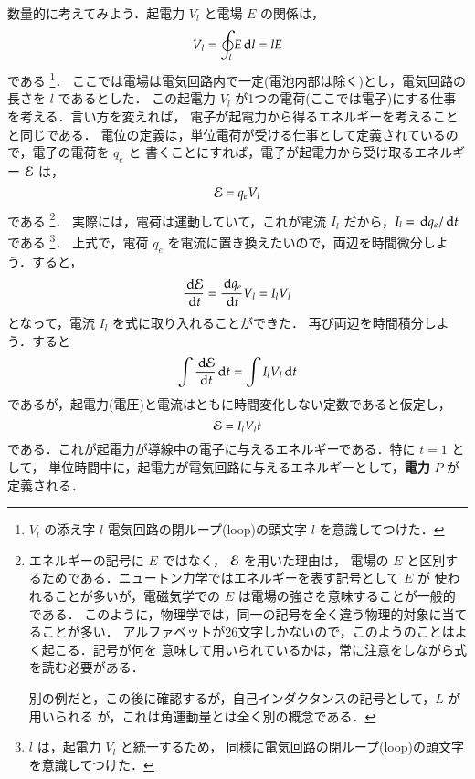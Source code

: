             数量的に考えてみよう．起電力 $V_{l}$ と電場 $E$ の関係は，
                \begin{equation*}
                    V_{l} = \oint_{l} E \,\mathrm{d} l = lE
                \end{equation*}
            である
                \footnote{
                    $V_{l}$ の添え字 $l$ 電気回路の閉ループ(loop)の頭文字 $l$ を意識してつけた．
                }．
            ここでは電場は電気回路内で一定(電池内部は除く)とし，電気回路の長さを $l$ であるとした．
            この起電力 $V_{l}$ が1つの電荷(ここでは電子)にする仕事を考える．言い方を変えれば，
            電子が起電力から得るエネルギーを考えることと同じである．
            電位の定義は，単位電荷が受ける仕事として定義されているので，電子の電荷を $q_{e}$ と
            書くことにすれば，電子が起電力から受け取るエネルギー $\mathcal{E}$ は，
                \begin{equation*}
                    \mathcal{E} = q_{e}V_{l}
                \end{equation*}
            である
                \footnote{
                    エネルギーの記号に $E$ ではなく， $\mathcal{E}$ を用いた理由は，
                    電場の $E$ と区別するためである．ニュートン力学ではエネルギーを表す記号として $E$ が
                    使われることが多いが，電磁気学での $E$ は電場の強さを意味することが一般的である．
                    このように，物理学では，同一の記号を全く違う物理的対象に当てることが多い．
                    アルファベットが26文字しかないので，このようのことはよく起こる．記号が何を
                    意味して用いられているかは，常に注意をしながら式を読む必要がある．

                    別の例だと，この後に確認するが，自己インダクタンスの記号として，$L$ が用いられる
                    が，これは角運動量とは全く別の概念である．
                }．
            実際には，電荷は運動していて，これが電流 $I_{l}$ だから，$I_{l}=\,\mathrm{d} q_{e}/\,\mathrm{d} t$ である
                \footnote{
                    $l$ は，起電力 $V_{l}$ と統一するため，
                    同様に電気回路の閉ループ(loop)の頭文字を意識してつけた．
                }．
            上式で，電荷 $q_{e}$ を電流に置き換えたいので，両辺を時間微分しよう．すると，
                \begin{equation*}
                    \frac{\,\mathrm{d} \mathcal{E}}{\,\mathrm{d} t} = \frac{\,\mathrm{d} q_{e}}{\,\mathrm{d} t}V_{l}=I_{l}V_{l}
                \end{equation*}
            となって，電流 $I_{l}$ を式に取り入れることができた．
            再び両辺を時間積分しよう．すると
                \begin{equation*}
                    \int \frac{\,\mathrm{d} \mathcal{E}}{\,\mathrm{d} t} \,\mathrm{d} t   =   \int I_{l}V_{l} \,\mathrm{d} t
                \end{equation*}
            であるが，起電力(電圧)と電流はともに時間変化しない定数であると仮定し，
                \begin{equation*}
                    \mathcal{E} = I_{l}V_{l}t
                \end{equation*}
            である．これが起電力が導線中の電子に与えるエネルギーである．特に $t = 1$ として，
            単位時間中に，起電力が電気回路に与えるエネルギーとして，\textbf{電力} $P$ が定義される．

